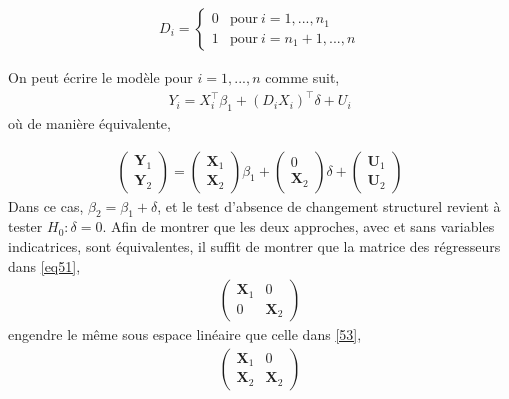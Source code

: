 \begin{align*}
D_i = 
\left\{
\begin{array}{cl}
0& \textrm{pour} \ i = 1,...,n_1\\
1& \textrm{pour} \ i = n_1 + 1,...,n
\end{array}
\right.
\end{align*}

On peut écrire le modèle pour $i=1,...,n$ comme suit,
\begin{align*}
Y_i = X_i^\top\beta_1 + (D_iX_i)^\top\delta + U_i
\end{align*}
où de manière équivalente,

\begin{align}
\left(
\begin{array}{c}
\mathbf{Y}_1\\
\mathbf{Y}_2
\end{array}
\right)
=
\left(
\begin{array}{c}
\mathbf{X}_1\\
\mathbf{X}_2
\end{array}
\right)
\beta_1
+
\left(
\begin{array}{c}
0\\
\mathbf{X}_2
\end{array}
\right)
\delta
+
\left(
\begin{array}{c}
\mathbf{U}_1\\
\mathbf{U}_2
\end{array}
\right)
\label{eq53}
\end{align}
Dans ce cas, $\beta_2 = \beta_1+\delta$, et le test d'absence de changement structurel revient à tester $H_0:\delta = 0$. Afin de montrer que les deux approches, avec et sans variables indicatrices, sont équivalentes, il suffit de montrer que la matrice des régresseurs dans \eqref{eq51},
\begin{align*}
\left(
\begin{array}{cc}
\mathbf{X}_1&0\\
0&\mathbf{X}_2
\end{array}
\right)
\end{align*}
engendre le même sous espace linéaire que celle dans \eqref{53},
\begin{align*}
\left(
\begin{array}{cc}
\mathbf{X}_1&0\\
\mathbf{X}_2&\mathbf{X}_2
\end{array}
\right)
\end{align*}

